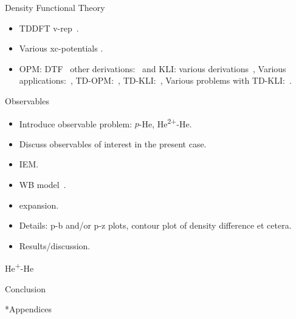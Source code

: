\documentclass[letterpaper, 11 pt]{article}
\begin{document}
\begin{section}{Density Functional Theory \label{chap:dft}}
\begin{itemize}
      \item TDDFT v-rep~\cite{td-vrep}.

      \item Various xc-potentials {\color{red}{Add some refs?}}.

      \item OPM: DTF~\cite{opm1, opm2} other derivations:~\cite{opm3, opm4, opm5, opm-rev} and
         KLI: various derivations~\cite{kli1, kli2, kli3},
         Various applications:~\cite[p. 254]{dft-engel},
         TD-OPM:~\cite{tdopm}, TD-KLI:~\cite{tdkli1, tdkli2, tdkli3}, Various problems with
         TD-KLI:~\cite[p. 134-135]{tddft}.

   \end{itemize}

\end{section}

\begin{section}{Observables \label{sec:p-he2p-he}}
   
   \begin{itemize}
      
      \item Introduce observable problem: $p$-He, He\textsuperscript{2+}-He.

      \item Discuss observables of interest in the present case.

      \item IEM.

      \item WB model~\cite{wb}.

      \item expansion.

      \item Details: p-b and/or p-z plots, contour plot of density difference et cetera.

      \item Results/discussion.

   \end{itemize}

\end{section}

\begin{section}{\texorpdfstring{He\textsuperscript{+}}{He+}-He \label{sec:hep-he}}

\end{section}

\begin{section}{Conclusion \label{sec:con}}

\end{section}

\begin{section}*{Appendices}

\end{section}


\end{document}
